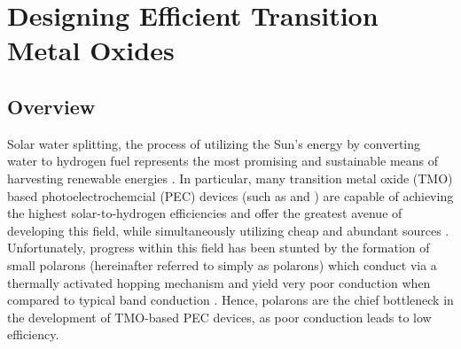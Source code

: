 \chapter{Designing Efficient Transition Metal Oxides}

\section{Overview}
Solar water splitting, the process of utilizing the Sun's energy by converting water to hydrogen fuel represents the most promising and sustainable means of harvesting renewable energies \cite{yao2018photoelectrocatalytic,tachibana2012artificial,walter2010solar}. In particular, many transition metal oxide (TMO) based photoelectrochemcial (PEC) devices (such as  and ) are capable of achieving the highest solar-to-hydrogen efficiencies and offer the greatest avenue of developing this field, while simultaneously utilizing cheap and abundant sources \cite{kim2019elaborately,tamirat2016using,lee2019progress}.
Unfortunately, progress within this field has been stunted by the formation of small polarons (hereinafter referred to simply as polarons) which conduct via a thermally activated hopping mechanism and yield very poor conduction when compared to typical band conduction \cite{bosman1970small}. Hence, polarons are the chief bottleneck in the development of TMO-based PEC devices, as poor conduction leads to low efficiency.


